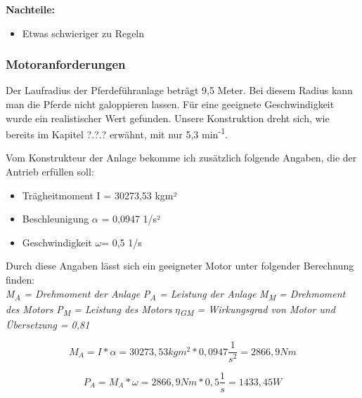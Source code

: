 \documentclass[12pt]{scrreprt} %
\begin{document}
\textbf{Nachteile:}

\begin{itemize}
	\item{Etwas schwieriger zu Regeln}
\end{itemize}

\subsubsection{Motoranforderungen}
\label{sec:motoranforderungen}

Der Laufradius der Pferdeführanlage beträgt 9,5 Meter. Bei diesem Radius kann man die Pferde nicht galoppieren lassen. 
Für eine geeignete Geschwindigkeit wurde ein realistischer Wert gefunden. %
Unsere Konstruktion dreht sich, wie bereits im Kapitel ?.?.? erwähnt, mit nur 5,3 min\textsuperscript{-1}. 

Vom Konstrukteur der Anlage bekomme ich zusätzlich folgende Angaben, die der Antrieb erfüllen soll:
\\

\begin{itemize}
	\item{Trägheitmoment I = 30273,53 kgm²}
	\item{Beschleunigung $\alpha$ = 0,0947 1/s²}
	\item{Geschwindigkeit $\omega$= 0,5 1/s}
\end{itemize}

Durch diese Angaben lässt sich ein geeigneter Motor unter folgender Berechnung finden:
\\
\textit{M\textsubscript{A} = Drehmoment der Anlage} \newline
\textit{P\textsubscript{A} = Leistung der Anlage} \newline
\textit{M\textsubscript{M} = Drehmoment des Motors} \newline
\textit{P\textsubscript{M} = Leistung des Motors} \newline
\textit{$\eta$\textsubscript{GM} = Wirkungsgrad von Motor und Übersetzung = 0,81}


\begin{center}
\begin{equation}
  \label{eq:2}
	M_{A} = I * \alpha = 30273,53kgm^2 * 0,0947 \dfrac{1}{s^2} = 2866,9 Nm
\end{equation} 
\end{center}


 
\begin{center}
\begin{equation}
  \label{eq:3}
	P_{A} = M_{A} * \omega = 2866,9 Nm * 0,5 \dfrac{1}{s} = 1433,45W
\end{equation} 
\end{center}
\end{document}
